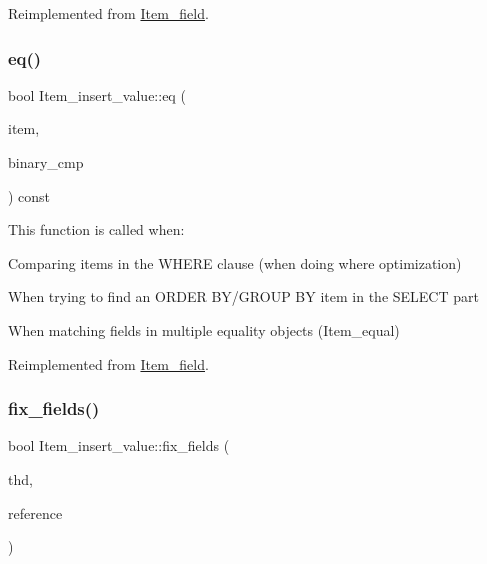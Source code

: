 Reimplemented from \mbox{\hyperlink{classItem__field_a9a5288fcbc34ac4bda07a8e11c86269c}{Item\+\_\+field}}.

\mbox{\label{classItem__insert__value_aa8be1a5d87cbe34ca0fc197a80522738}} 
\subsubsection{\texorpdfstring{eq()}{eq()}}
{\footnotesize\ttfamily bool Item\+\_\+insert\+\_\+value\+::eq (\begin{DoxyParamCaption}\item[{const \mbox{\hyperlink{classItem}{Item}} $\ast$}]{item,  }\item[{bool}]{binary\+\_\+cmp }\end{DoxyParamCaption}) const\hspace{0.3cm}{\ttfamily [virtual]}}

This function is called when\+:
\begin{DoxyItemize}
\item Comparing items in the W\+H\+E\+RE clause (when doing where optimization)
\item When trying to find an O\+R\+D\+ER B\+Y/\+G\+R\+O\+UP BY item in the S\+E\+L\+E\+CT part
\item When matching fields in multiple equality objects (Item\+\_\+equal) 
\end{DoxyItemize}

Reimplemented from \mbox{\hyperlink{classItem__field_a009fb19dc742f706ec5c8bad9a6a0c2d}{Item\+\_\+field}}.

\mbox{\label{classItem__insert__value_aa2da2c08853e6acded41a9e83f137ff8}} 
\subsubsection{\texorpdfstring{fix\+\_\+fields()}{fix\_fields()}}
{\footnotesize\ttfamily bool Item\+\_\+insert\+\_\+value\+::fix\+\_\+fields (\begin{DoxyParamCaption}\item[{T\+HD $\ast$}]{thd,  }\item[{\mbox{\hyperlink{classItem}{Item}} $\ast$$\ast$}]{reference }\end{DoxyParamCaption})\hspace{0.3cm}{\ttfamily [virtual]}}

